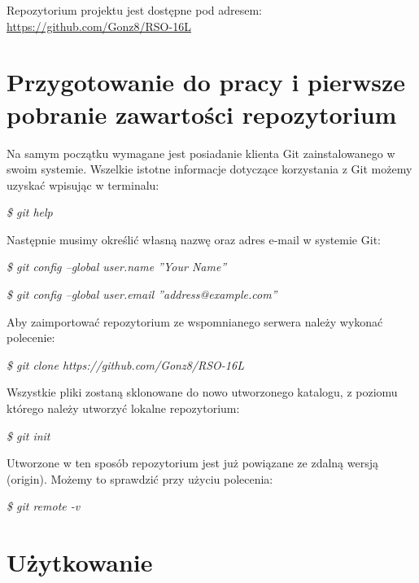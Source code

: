 Repozytorium projektu jest dostępne pod adresem: \url{https://github.com/Gonz8/RSO-16L}

\section{Przygotowanie do pracy i pierwsze pobranie zawartości repozytorium}
	Na samym początku wymagane jest posiadanie klienta Git zainstalowanego w swoim systemie. Wszelkie istotne informacje dotyczące korzystania z Git możemy uzyskać wpisując w terminalu:\begin{center} \textit{\$ git help} \end{center}
Następnie musimy określić własną nazwę oraz adres e-mail w systemie Git:
\begin{center}\textit{\$ git config --global user.name ''Your Name''}\end{center}
\begin{center}\textit{\$ git config --global user.email ''address@example.com''} \end{center}
Aby zaimportować repozytorium ze wspomnianego serwera należy wykonać polecenie:
\begin{center}\textit{\$ git clone https://github.com/Gonz8/RSO-16L}\end{center}
Wszystkie pliki zostaną sklonowane do nowo utworzonego katalogu, z poziomu którego należy utworzyć lokalne repozytorium:
\begin{center}\textit{\$ git init}\end{center}
Utworzone w ten sposób repozytorium jest już powiązane ze zdalną wersją (origin). Możemy to sprawdzić przy użyciu polecenia:
\begin{center}\textit{\$ git remote -v}\end{center}

\section{Użytkowanie}

